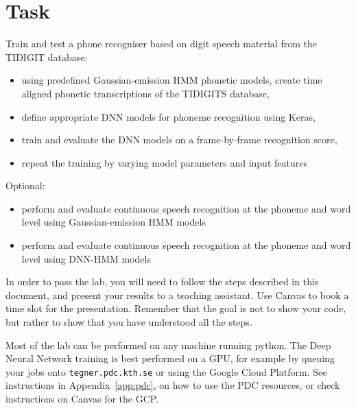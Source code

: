 \documentclass{nada-ten}
\begin{document}
\section{Task}
Train and test a phone recogniser based on digit speech material from the TIDIGIT database:
\begin{itemize}
\item using predefined Gaussian-emission HMM phonetic models, create time aligned phonetic transcriptions of the TIDIGITS database,
\item define appropriate DNN models for phoneme recognition using Keras,
\item train and evaluate the DNN models on a frame-by-frame recognition score,
\item repeat the training by varying model parameters and input features
\end{itemize}
Optional:
\begin{itemize}
\item perform and evaluate continuous speech recognition at the phoneme and word level using Gaussian-emission HMM models
\item perform and evaluate continuous speech recognition at the phoneme and word level using DNN-HMM models
\end{itemize}

In order to pass the lab, you will need to follow the steps described in this document, and present your results to a teaching assistant. Use Canvas to book a time slot for the presentation. Remember that the goal is not to show your code, but rather to show that you have understood all the steps.

%
%

Most of the lab can be performed on any machine running python. The Deep Neural Network training is best performed on a GPU, for example by queuing your jobs onto \texttt{tegner.pdc.kth.se} or using the Google Cloud Platform. See instructions in Appendix~\ref{app:pdc}, on how to use the PDC resources, or check instructions on Canvas for the GCP.
\end{document}
